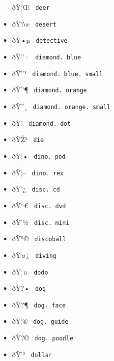 \begin{itemize}
  \label{symbol-deer}{{ ðŸ¦Œ } \texttt{\ deer\ }}
\item
  \label{symbol-desert}{{ ðŸ?œ } \texttt{\ desert\ }}
\item
  \label{symbol-detective}{{ ðŸ•µ }
  \texttt{\ detective\ }}
\item
  \label{symbol-diamond.blue}{{ ðŸ''· }
  \texttt{\ diamond.\ blue\ }}
\item
  \label{symbol-diamond.blue.small}{{ ðŸ''¹ }
  \texttt{\ diamond.\ blue.\ small\ }}
\item
  \label{symbol-diamond.orange}{{ ðŸ''¶ }
  \texttt{\ diamond.\ orange\ }}
\item
  \label{symbol-diamond.orange.small}{{ ðŸ''¸ }
  \texttt{\ diamond.\ orange.\ small\ }}
\item
  \label{symbol-diamond.dot}{{ ðŸ' }
  \texttt{\ diamond.\ dot\ }}
\item
  \label{symbol-die}{{ ðŸŽ² } \texttt{\ die\ }}
\item
  \label{symbol-dino.pod}{{ ðŸ¦• }
  \texttt{\ dino.\ pod\ }}
\item
  \label{symbol-dino.rex}{{ ðŸ¦-- }
  \texttt{\ dino.\ rex\ }}
\item
  \label{symbol-disc.cd}{{ ðŸ'¿ } \texttt{\ disc.\ cd\ }}
\item
  \label{symbol-disc.dvd}{{ ðŸ``€ }
  \texttt{\ disc.\ dvd\ }}
\item
  \label{symbol-disc.mini}{{ ðŸ'½ }
  \texttt{\ disc.\ mini\ }}
\item
  \label{symbol-discoball}{{ ðŸª© }
  \texttt{\ discoball\ }}
\item
  \label{symbol-diving}{{ ðŸ¤¿ } \texttt{\ diving\ }}
\item
  \label{symbol-dodo}{{ ðŸ¦¤ } \texttt{\ dodo\ }}
\item
  \label{symbol-dog}{{ ðŸ?• } \texttt{\ dog\ }}
\item
  \label{symbol-dog.face}{{ ðŸ?¶ }
  \texttt{\ dog.\ face\ }}
\item
  \label{symbol-dog.guide}{{ ðŸ¦® }
  \texttt{\ dog.\ guide\ }}
\item
  \label{symbol-dog.poodle}{{ ðŸ?© }
  \texttt{\ dog.\ poodle\ }}
\item
  \label{symbol-dollar}{{ ðŸ'² } \texttt{\ dollar\ }}

\end{itemize}
